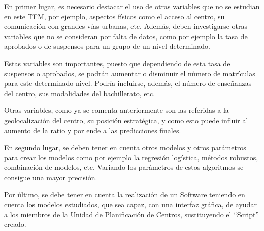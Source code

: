 En primer lugar, es necesario destacar el uso de otras variables que no se estudian en este TFM, por ejemplo, aspectos físicos como el acceso al centro, su comunicación con grandes vías urbanas, etc. Además, deben investigarse otras variables que no se consideran por falta de datos, como por ejemplo la tasa de aprobados o de suspensos para un grupo de un nivel determinado.

Estas variables son importantes, puesto que dependiendo de esta tasa de suspensos o aprobados, se podrán aumentar o disminuir el número de matrículas para este determinado nivel. Podría incluirse, además, el número de enseñanzas del centro, sus modalidades del bachillerato, etc.

Otras variables, como ya se comenta anteriormente son las referidas a la geolocalización del centro, su posición estratégica, y como esto puede influir al aumento de la ratio y por ende a las predicciones finales.

En segundo lugar, se deben tener en cuenta otros modelos y otros parámetros para crear los modelos como por ejemplo la regresión logística, métodos robustos, combinación de modelos, etc. Variando los parámetros de estos algoritmos se consigue una mayor precisión.

Por último, se debe tener en cuenta la realización de un Software teniendo en cuenta los modelos estudiados, que sea capaz, con una interfaz gráfica, de ayudar a los miembros de la Unidad de Planificación de Centros, sustituyendo el ``Script'' creado.

